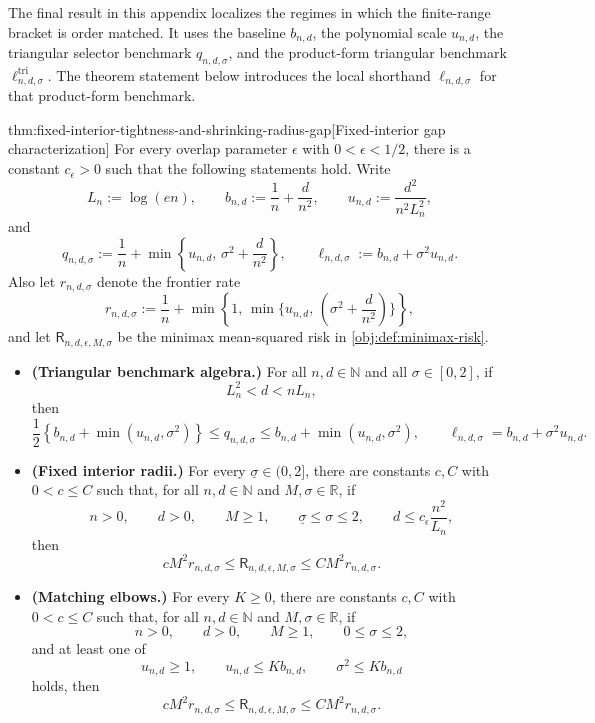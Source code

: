 The final result in this appendix localizes the regimes in which the finite-range bracket is order matched. It uses the baseline \(b_{n,d}\), the polynomial scale \(u_{n,d}\), the triangular selector benchmark \(q_{n,d,\sigma}\), and the product-form triangular benchmark \(\ell^{\mathrm{tri}}_{n,d,\sigma}\). The theorem statement below introduces the local shorthand \(\ell_{n,d,\sigma}\) for that product-form benchmark.

\begin{theoremv}{thm:fixed-interior-tightness-and-shrinking-radius-gap}[Fixed-interior gap characterization]
For every overlap parameter \(\epsilon\) with \(0<\epsilon<1/2\), there is a constant \(c_\epsilon>0\) such that the following statements hold.  Write
\[
L_n:=\log(en),\qquad
b_{n,d}:=\frac1n+\frac d{n^2},\qquad
u_{n,d}:=\frac{d^2}{n^2L_n^2},
\]
and
\[
q_{n,d,\sigma}:=\frac1n+\min\left\{u_{n,d},\,\sigma^2+\frac d{n^2}\right\},
\qquad
\ell_{n,d,\sigma}:=b_{n,d}+\sigma^2u_{n,d}.
\]
Also let \(r_{n,d,\sigma}\) denote the frontier rate
\[
r_{n,d,\sigma}:=\frac1n+\min\left\{1,\,\min\{u_{n,d},\,\left(\sigma^2+\frac d{n^2}\right)\}\right\},
\]
and let \(\mathsf R_{n,d,\epsilon,M,\sigma}\) be the minimax mean-squared risk in \cref{obj:def:minimax-risk}.

\begin{itemize}
\item \textbf{(Triangular benchmark algebra.)}  For all \(n,d\in\mathbb N\) and all \(\sigma\in[0,2]\), if
\[
L_n^2<d<nL_n,
\]
then
\[
\frac12\left\{b_{n,d}+\min(u_{n,d},\sigma^2)\right\}
\le q_{n,d,\sigma}
\le b_{n,d}+\min(u_{n,d},\sigma^2),
\qquad
\ell_{n,d,\sigma}=b_{n,d}+\sigma^2u_{n,d}.
\]

\item \textbf{(Fixed interior radii.)}  For every \(\underline\sigma\in(0,2]\), there are constants \(c,C\) with \(0<c\le C\) such that, for all \(n,d\in\mathbb N\) and \(M,\sigma\in\mathbb R\), if
\[
n>0,\qquad d>0,\qquad M\ge1,\qquad
\underline\sigma\le\sigma\le2,\qquad
d\le c_\epsilon\frac{n^2}{L_n},
\]
then
\[
cM^2r_{n,d,\sigma}
\le
\mathsf R_{n,d,\epsilon,M,\sigma}
\le
CM^2r_{n,d,\sigma}.
\]

\item \textbf{(Matching elbows.)}  For every \(K\ge0\), there are constants \(c,C\) with \(0<c\le C\) such that, for all \(n,d\in\mathbb N\) and \(M,\sigma\in\mathbb R\), if
\[
n>0,\qquad d>0,\qquad M\ge1,\qquad 0\le\sigma\le2,
\]
and at least one of
\[
u_{n,d}\ge1,\qquad
u_{n,d}\le Kb_{n,d},\qquad
\sigma^2\le Kb_{n,d}
\]
holds, then
\[
cM^2r_{n,d,\sigma}
\le
\mathsf R_{n,d,\epsilon,M,\sigma}
\le
CM^2r_{n,d,\sigma}.
\]


\end{itemize}
\end{theoremv}

